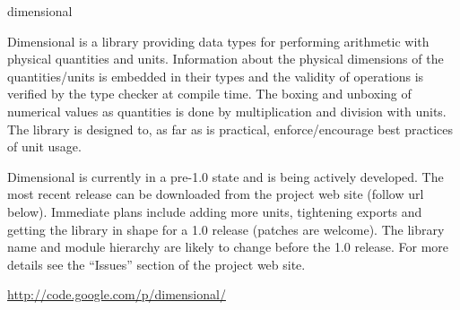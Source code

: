 \begin{hcarentry}[new]{dimensional}
\label{dimensional}
\makeheader

Dimensional is a library providing data types for performing
arithmetic with physical quantities and units. Information about
the physical dimensions of the quantities/units is embedded in their
types and the validity of operations is verified by the type checker
at compile time. The boxing and unboxing of numerical values as
quantities is done by multiplication and division with units. The
library is designed to, as far as is practical, enforce/encourage
best practices of unit usage.

Dimensional is currently in a pre-1.0 state and is being actively
developed. The most recent release can be downloaded from the project
web site (follow url below). Immediate plans include adding more
units, tightening exports and getting the library in shape for a
1.0 release (patches are welcome). The library name and module
hierarchy are likely to change before the 1.0 release. For more
details see the ``Issues'' section of the project web site.

\FurtherReading
 \url{http://code.google.com/p/dimensional/}
\end{hcarentry}
